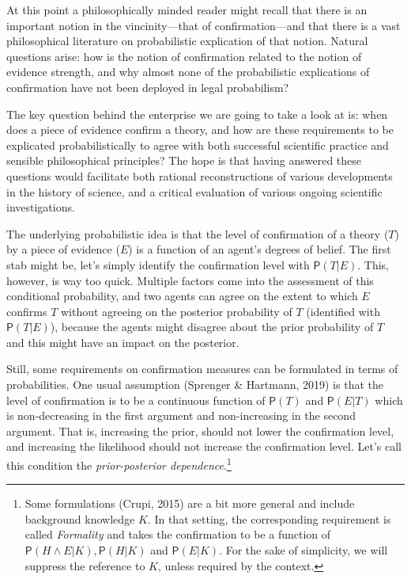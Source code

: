 \documentclass[
  10pt,
  dvipsnames,enabledeprecatedfontcommands]{scrartcl}
\newcommand{\et}{\wedge}
\newcommand{\pr}[1]{\mathsf{P}(#1)}
\begin{document}
At this point a philosophically minded reader might recall that there is
an important notion in the vincinity---that of confirmation---and that
there is a vast philosophical literature on probabilistic explication of
that notion. Natural questions arise: how is the notion of confirmation
related to the notion of evidence strength, and why almost none of the
probabilistic explications of confirmation have not been deployed in
legal probabilism?

The key question behind the enterprise we are going to take a look at
is: when does a piece of evidence confirm a theory, and how are these
requirements to be explicated probabilistically to agree with both
successful scientific practice and sensible philosophical principles?
The hope is that having answered these questions would facilitate both
rational reconstructions of various developments in the history of
science, and a critical evaluation of various ongoing scientific
investigations.

The underlying probabilistic idea is that the level of confirmation of a
theory (\(T\)) by a piece of evidence (\(E\)) is a function of an
agent's degrees of belief. The first stab might be, let's simply
identify the confirmation level with \(\pr{T \vert E}\). This, however,
is way too quick. Multiple factors come into the assessment of this
conditional probability, and two agents can agree on the extent to which
\(E\) confirms \(T\) without agreeing on the posterior probability of
\(T\) (identified with \(\pr{T \vert E}\)), because the agents might
disagree about the prior probability of \(T\) and this might have an
impact on the posterior.

Still, some requirements on confirmation measures can be formulated in
terms of probabilities. One usual assumption (Sprenger \& Hartmann,
2019) is that the level of confirmation is to be a continuous function
of \(\pr{T}\) and \(\pr{E\vert T}\) which is non-decreasing in the first
argument and non-increasing in the second argument. That is, increasing
the prior, should not lower the confirmation level, and increasing the
likelihood should not increase the confirmation level. Let's call this
condition the \emph{prior-posterior dependence}.\footnote{Some
  formulations (Crupi, 2015) are a bit more general and include
  background knowledge \(K\). In that setting, the corresponding
  requirement is called \emph{Formality} and takes the confirmation to
  be a function of \(\pr{H \et E \vert K}, \pr{H\vert K}\) and
  \(\pr{E\vert K}\). For the sake of simplicity, we will suppress the
  reference to \(K\), unless required by the context.}
\end{document}
